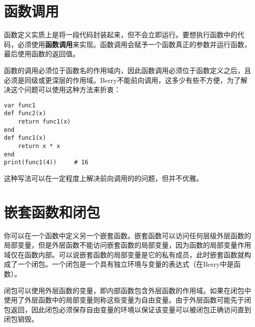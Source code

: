 \section{函数调用}

函数定义实质上是将一段代码封装起来，但不会立即运行。要想执行函数中的代码，必须使用\textbf{函数调用}来实现。函数调用会赋予一个函数真正的参数并运行函数，最后使用函数的返回值。

函数的调用必须位于函数名的作用域内，因此函数调用必须位于函数定义之后，且必须是同级或更深层的作用域。Berry不能前向调用，这多少有些不方便，为了解决这个问题可以使用这种方法来折衷：
\begin{lstlisting}[language=berry, numbers=none]
var func1
def func2(x)
    return func1(x)
end
def func1(x)
    return x * x
end
print(func1(4))     # 16
\end{lstlisting}
这种写法可以在一定程度上解决前向调用的的问题，但并不优雅。

\section{嵌套函数和闭包}

你可以在一个函数中定义另一个嵌套函数。嵌套函数可以访问任何层级外层函数的局部变量，但是外层函数不能访问嵌套函数的局部变量，因为函数的局部变量作用域仅在函数内部。可以说嵌套函数的局部变量是它的私有成员，此时嵌套函数就构成了一个闭包。一个闭包是一个具有独立环境与变量的表达式（在Berry中是函数）。

闭包可以使用外层函数的变量，即内部函数包含外层函数的作用域。如果在闭包中使用了外层函数中的局部变量则称这些变量为自由变量。由于外层函数可能先于闭包返回，因此闭包必须保存自由变量的环境以保证该变量可以被闭包正确访问直到闭包销毁。
